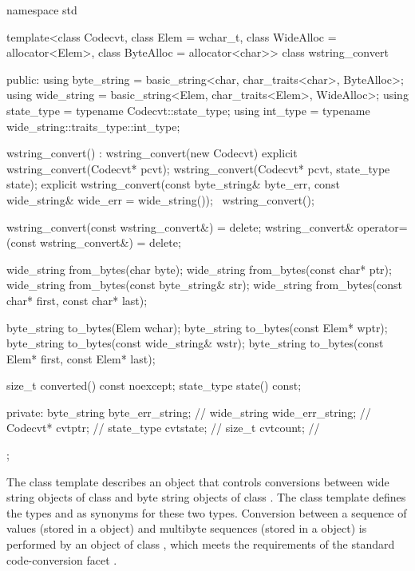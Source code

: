 %
\begin{codeblock}
namespace std {
  template<class Codecvt, class Elem = wchar_t,
           class WideAlloc = allocator<Elem>,
           class ByteAlloc = allocator<char>>
    class wstring_convert {
    public:
      using byte_string = basic_string<char, char_traits<char>, ByteAlloc>;
      using wide_string = basic_string<Elem, char_traits<Elem>, WideAlloc>;
      using state_type  = typename Codecvt::state_type;
      using int_type    = typename wide_string::traits_type::int_type;

      wstring_convert() : wstring_convert(new Codecvt) {}
      explicit wstring_convert(Codecvt* pcvt);
      wstring_convert(Codecvt* pcvt, state_type state);
      explicit wstring_convert(const byte_string& byte_err,
                               const wide_string& wide_err = wide_string());
      ~wstring_convert();

      wstring_convert(const wstring_convert&) = delete;
      wstring_convert& operator=(const wstring_convert&) = delete;

      wide_string from_bytes(char byte);
      wide_string from_bytes(const char* ptr);
      wide_string from_bytes(const byte_string& str);
      wide_string from_bytes(const char* first, const char* last);

      byte_string to_bytes(Elem wchar);
      byte_string to_bytes(const Elem* wptr);
      byte_string to_bytes(const wide_string& wstr);
      byte_string to_bytes(const Elem* first, const Elem* last);

      size_t converted() const noexcept;
      state_type state() const;

    private:
      byte_string byte_err_string;  // \expos
      wide_string wide_err_string;  // \expos
      Codecvt* cvtptr;              // \expos
      state_type cvtstate;          // \expos
      size_t cvtcount;              // \expos
    };
}
\end{codeblock}

\pnum
The class template describes an object that controls conversions between wide
string objects of class  and byte string objects of class . The class template defines the types
 and  as synonyms for these two types.
Conversion between a sequence of  values (stored in a
 object) and multibyte sequences (stored in a
 object) is performed by an object of class
, which meets the
requirements of the standard code-conversion facet .

